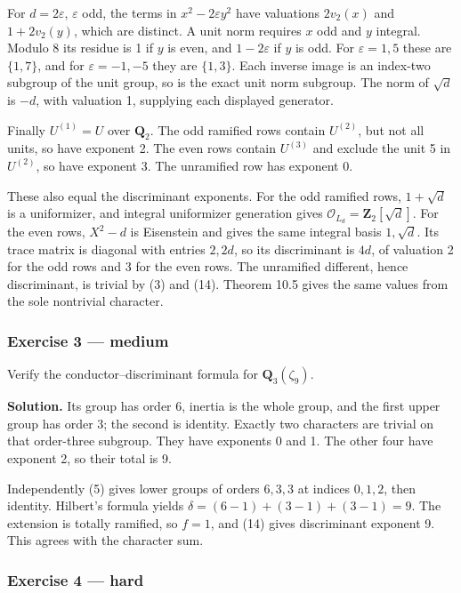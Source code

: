 \documentclass[11pt,a4paper]{article}
\begin{document}
For \(d=2\varepsilon\), \(\varepsilon\) odd, the terms in
\(x^2-2\varepsilon y^2\) have valuations \(2v_2(x)\) and \(1+2v_2(y)\),
which are distinct. A unit norm requires \(x\) odd and \(y\) integral.
Modulo 8 its residue is 1 if \(y\) is even, and \(1-2\varepsilon\) if
\(y\) is odd. For \(\varepsilon=1,5\) these are \(\{1,7\}\), and for
\(\varepsilon=-1,-5\) they are \(\{1,3\}\). Each inverse image is an
index-two subgroup of the unit group, so is the exact unit norm
subgroup. The norm of \(\sqrt d\) is \(-d\), with valuation 1, supplying
each displayed generator.

Finally \(U^{(1)}=U\) over \(\mathbf Q_2\). The odd ramified rows
contain \(U^{(2)}\), but not all units, so have exponent 2. The even
rows contain \(U^{(3)}\) and exclude the unit 5 in \(U^{(2)}\), so have
exponent 3. The unramified row has exponent 0.

These also equal the discriminant exponents. For the odd ramified rows,
\(1+\sqrt d\) is a uniformizer, and integral uniformizer generation
gives \(\mathcal O_{L_d}=\mathbf Z_2[\sqrt d]\). For the even rows,
\(X^2-d\) is Eisenstein and gives the same integral basis \(1,\sqrt d\).
Its trace matrix is diagonal with entries \(2,2d\), so its discriminant
is \(4d\), of valuation 2 for the odd rows and 3 for the even rows. The
unramified different, hence discriminant, is trivial by (3) and (14).
Theorem 10.5 gives the same values from the sole nontrivial character.

\subsubsection{Exercise 3 --- medium}\label{exercise-3-medium}

Verify the conductor--discriminant formula for \(\mathbf Q_3(\zeta_9)\).

\textbf{Solution.} Its group has order 6, inertia is the whole group,
and the first upper group has order 3; the second is identity. Exactly
two characters are trivial on that order-three subgroup. They have
exponents 0 and 1. The other four have exponent 2, so their total is 9.

Independently (5) gives lower groups of orders \(6,3,3\) at indices
\(0,1,2\), then identity. Hilbert's formula yields
\(\delta=(6-1)+(3-1)+(3-1)=9\). The extension is totally ramified, so
\(f=1\), and (14) gives discriminant exponent 9. This agrees with the
character sum.

\subsubsection{Exercise 4 --- hard}\label{exercise-4-hard}
\end{document}
